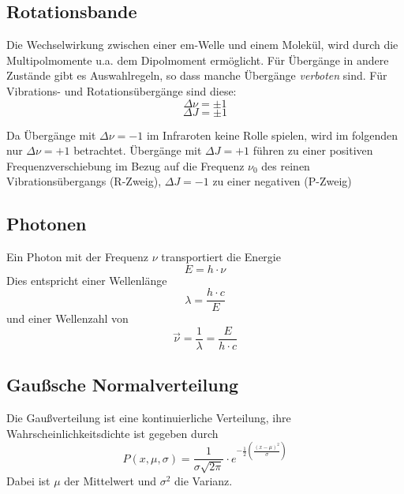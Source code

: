 \documentclass{article}
\begin{document}
    \subsection{Rotationsbande}
        Die Wechselwirkung zwischen einer em-Welle und einem Molekül, wird durch die Multipolmomente u.a. dem Dipolmoment ermöglicht. 
		Für Übergänge in andere Zustände gibt es Auswahlregeln, so dass manche Übergänge \textit{verboten} sind.
		Für Vibrations- und Rotationsübergänge sind diese:
		\begin{equation}
			\Delta \nu = \pm1
		\end{equation}
		\begin{equation}		  
			\Delta J = \pm1
		\end{equation}		   	
    	
    	Da Übergänge mit $\Delta \nu = -1$ im Infraroten keine Rolle spielen, wird im folgenden nur $\Delta \nu = +1$ betrachtet.
    	Übergänge mit $\Delta J = +1$ führen zu einer positiven Frequenzverschiebung im Bezug auf die Frequenz $\nu_0$ des reinen Vibrationsübergangs (R-Zweig), $\Delta J = -1$ zu einer negativen (P-Zweig)
    
    \subsection{Photonen}
        Ein Photon mit der Frequenz $\nu$ transportiert die Energie
        \begin{equation}
            E = h\cdot \nu
        \end{equation}
        Dies entspricht einer Wellenlänge
        \begin{equation}
            \lambda = \frac{h\cdot c}{E}
        \end{equation}
        und einer Wellenzahl von
        \begin{equation}
            \vec{\nu} = \frac{1}{\lambda} = \frac{E}{h\cdot c}
        \end{equation}
    
    \subsection{Gaußsche Normalverteilung}
        Die Gaußverteilung ist eine kontinuierliche Verteilung, ihre Wahrscheinlichkeitsdichte ist
        gegeben durch
        $$ P(x,\mu, \sigma) = \frac{1}{\sigma\sqrt{2\pi}}\cdot e^{-\frac{1}{2}(\frac{(x-\mu)^2}{\sigma})}$$
        Dabei ist $\mu$ der Mittelwert und $\sigma^2$ die Varianz.
    
\end{document}
